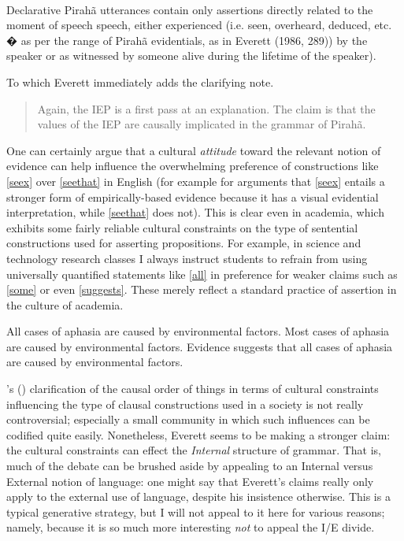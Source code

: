 \documentclass[11pt]{article}
\newcommand{\posscitet}[1]{\citeauthor{#1}'s (\citeyear{#1})}
\begin{document}
\begin{exe}
\\
Declarative Pirah\~a utterances contain only assertions directly related to the moment of speech speech, either experienced (i.e. seen, overheard, deduced, etc. � as per the range of Pirah\~a evidentials, as in Everett (1986, 289)) by the speaker or as witnessed by someone alive during the lifetime of the speaker).
\end{exe}

To which Everett immediately adds the clarifying note.
\begin{quote}
Again, the IEP is a first pass at an explanation. The claim is that the values of the IEP are
causally implicated in the grammar of Pirah\~a.
\end{quote} 

One can certainly argue that a cultural \textsl{attitude} toward the relevant notion of evidence can help influence the overwhelming preference of constructions like \ref{seex} over \ref{seethat} in English (for example \cite{bowles09evidence} for arguments that \ref{seex} entails a stronger form of empirically-based evidence because it has a visual evidential interpretation, while \ref{seethat} does not). This is clear even in academia, which exhibits some fairly reliable cultural constraints on the type of sentential constructions used for asserting propositions. For example, in science and technology research classes I always instruct students to refrain from using universally quantified statements like \ref{all} in preference for weaker claims such as \ref{some} or even \ref{suggests}. These merely reflect a standard practice of assertion in the culture of academia.

\begin{exe}
\ex 
\begin{xlist}
\ex All cases of aphasia are caused by environmental factors.\label{all}
\ex Most cases of aphasia are caused by environmental factors.\label{some}
\ex Evidence suggests that all cases of aphasia are caused by environmental factors.\label{suggests}
\end{xlist}
\end{exe} 

\posscitet{everett09response} clarification of the causal order of things in terms of cultural constraints influencing the type of clausal constructions used in a society is not really controversial; especially a small community in which such influences can be codified quite easily. Nonetheless, Everett seems to be making a stronger claim: the cultural constraints can effect the \textsl{Internal} structure of grammar. That is, much of the debate can be brushed aside by appealing to an Internal versus External notion of language: one might say that Everett's claims really only apply to the external use of language, despite his insistence otherwise. This is a typical generative strategy, but I will not appeal to it here for various reasons; namely, because it is so much more interesting \textsl{not} to appeal the I/E divide. 
\end{document}
